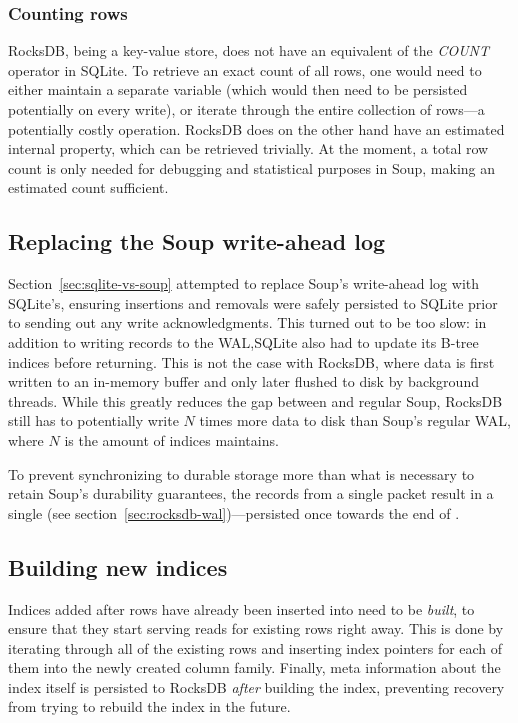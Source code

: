 \subsubsection{Counting rows}

RocksDB, being a key-value store, does not have an equivalent of the
\textit{COUNT} operator in SQLite. To retrieve an exact count of all rows, one
would need to either maintain a separate variable (which would then need to be
persisted potentially on every write), or iterate through the entire collection
of rows---a potentially costly operation. RocksDB does on the other hand have an
estimated internal property,  which can be
retrieved trivially. At the moment, a total row count is only needed for
debugging and statistical purposes in Soup, making an estimated count
sufficient.

\subsection{Replacing the Soup write-ahead log}

Section~\ref{sec:sqlite-vs-soup} attempted to replace Soup's write-ahead log
with SQLite's, ensuring insertions and removals were safely persisted to SQLite
prior to sending out any write acknowledgments. This turned out to be too slow:
in addition to writing records to the WAL,\@ SQLite also had to update its B-tree
indices before returning. This is not the case with RocksDB, where data is first
written to an in-memory buffer and only later flushed to disk by background
threads. While this greatly reduces the gap between  and
regular Soup, RocksDB still has to potentially write $ N  $ times more data to
disk than Soup's regular WAL, where $ N $ is the amount of indices
 maintains.

To prevent synchronizing to durable storage more than what is necessary to
retain Soup's durability guarantees, the records from a single packet result in
a single  (see section~\ref{sec:rocksdb-wal})---persisted once
towards the end of .

\subsection{Building new indices}

Indices added after rows have already been inserted into 
need to be \textit{built}, to ensure that they start serving reads for
existing rows right away. This is done by iterating through all of the existing
rows and inserting index pointers for each of them into the newly created column
family. Finally, meta information about the index itself is persisted to RocksDB
\textit{after} building the index, preventing recovery from trying to rebuild
the index in the future.

